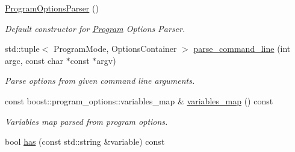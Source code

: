 \begin{DoxyCompactItemize}
\item 
\hyperlink{classsocketplay_1_1ProgramOptionsParser_a2e0d3b6136470b57be905a20ba8c1db7}{Program\+Options\+Parser} ()\hypertarget{classsocketplay_1_1ProgramOptionsParser_a2e0d3b6136470b57be905a20ba8c1db7}{}\label{classsocketplay_1_1ProgramOptionsParser_a2e0d3b6136470b57be905a20ba8c1db7}

\begin{DoxyCompactList}\small\item\em Default constructor for \hyperlink{classsocketplay_1_1Program}{Program} Options Parser. \end{DoxyCompactList}\item 
std\+::tuple$<$ Program\+Mode, Options\+Container $>$ \hyperlink{classsocketplay_1_1ProgramOptionsParser_ad9d10b64a800bbdd5fa2f27cb35d14ad}{parse\+\_\+command\+\_\+line} (int argc, const char $\ast$const $\ast$argv)
\begin{DoxyCompactList}\small\item\em Parse options from given command line arguments. \end{DoxyCompactList}\item 
const boost\+::program\+\_\+options\+::variables\+\_\+map \& \hyperlink{classsocketplay_1_1ProgramOptionsParser_a9b01f381d32504969c720c03f85cba3e}{variables\+\_\+map} () const \hypertarget{classsocketplay_1_1ProgramOptionsParser_a9b01f381d32504969c720c03f85cba3e}{}\label{classsocketplay_1_1ProgramOptionsParser_a9b01f381d32504969c720c03f85cba3e}

\begin{DoxyCompactList}\small\item\em Variables map parsed from program options. \end{DoxyCompactList}\item 
bool \hyperlink{classsocketplay_1_1ProgramOptionsParser_a220bfd81a57fb5aa3ff969b8539ceb61}{has} (const std\+::string \&variable) const \hypertarget{classsocketplay_1_1ProgramOptionsParser_a220bfd81a57fb5aa3ff969b8539ceb61}{}\label{classsocketplay_1_1ProgramOptionsParser_a220bfd81a57fb5aa3ff969b8539ceb61}


\end{DoxyCompactItemize}
